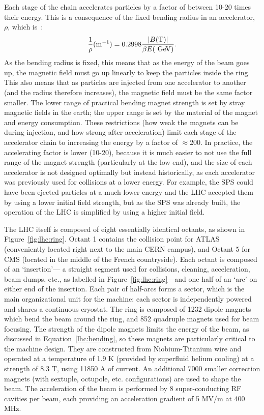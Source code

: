 Each stage of the chain accelerates particles by a factor of between 10-20 times their energy. This is a consequence of the fixed bending radius in an accelerator, $\rho$, which is~\cite{accelerator-book}:
%
\begin{equation}
\label{lhc:bending}
\frac{1}{\rho} (\mathrm{m}^{-1}) = 0.2998 \frac{|B (\mathrm{T})|}{\beta E (\GeV)}.
\end{equation}
%
As the bending radius is fixed, this means that as the energy of the beam goes up, the magnetic field must go up linearly to keep the particles inside the ring. This also means that as particles are injected from one accelerator to another (and the radius therefore increases), the magnetic field must be the same factor smaller. The lower range of practical bending magnet strength is set by stray magnetic fields in the earth; the upper range is set by the material of the magnet and energy consumption. These restrictions (how weak the magnets can be during injection, and how strong after acceleration) limit each stage of the accelerator chain to increasing the energy by a factor of $\approx$200. In practice, the accelerating factor is lower (10-20), because it is much easier to not use the full range of the magnet strength (particularly at the low end), and the size of each accelerator is not designed optimally but instead historically, as each accelerator was previously used for collisions at a lower energy. For example, the SPS could have been ejected particles at a much lower energy and the LHC accepted them by using a lower initial field strength, but as the SPS was already built, the operation of the LHC is simplified by using a higher initial field. 


The LHC itself is composed of eight essentially identical octants, as shown in Figure~\ref{fig:lhc:ring}. Octant 1 contains the collision point for ATLAS (conveniently located right next to the main CERN campus), and Octant 5 for CMS (located in the middle of the French countryside). Each octant is composed of an `insertion'--- a straight segment used for collisions, cleaning, acceleration, beam dumps, etc., as labelled in Figure~\ref{fig:lhc:ring}---and one half of an `arc' on either end of the insertion. Each pair of half-arcs forms a sector, which is the main organizational unit for the machine: each sector is independently powered and shares a continuous cryostat. The ring is composed of 1232 dipole magnets which bend the beam around the ring, and 852 quadruple magnets used for beam focusing. The strength of the dipole magnets limits the energy of the beam, as discussed in Equation~\ref{lhc:bending}, so these magnets are particularly critical to the machine design. They are constructed from Niobium-Titanium wire and operated at a temperature of 1.9 K (provided by superfluid helium cooling) at a strength of 8.3 T, using 11850 A of current. An additional 7000 smaller correction magnets (with sextuple, octupole, etc. configurations) are used to shape the beam. The acceleration of the beam is performed by 8 super-conducting RF cavities per beam, each providing an acceleration gradient of 5 MV/m at 400 MHz. 

